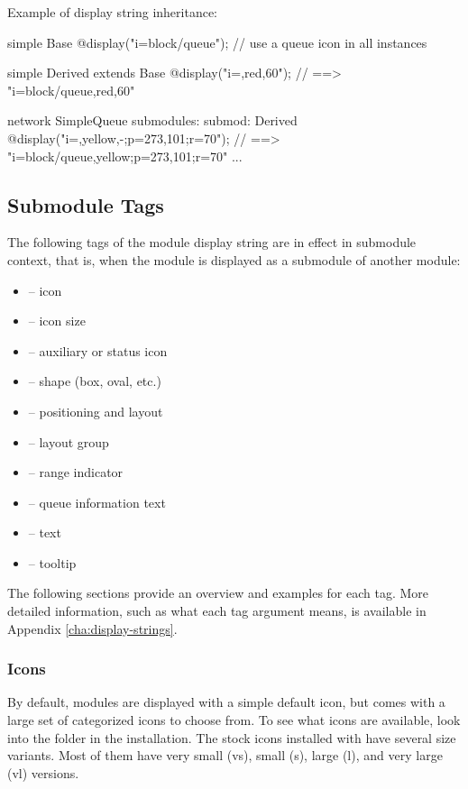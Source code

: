 Example of display string inheritance:

\begin{ned}
simple Base {
    @display("i=block/queue"); // use a queue icon in all instances
}

simple Derived extends Base {
    @display("i=,red,60");  // ==> "i=block/queue,red,60"
}

network SimpleQueue {
    submodules:
        submod: Derived {
            @display("i=,yellow,-;p=273,101;r=70");
                     // ==> "i=block/queue,yellow;p=273,101;r=70"
        }
        ...
}
\end{ned}


\subsection{Submodule Tags}
\label{sec:graphics:submodule-displaystring-tags}

The following tags of the module display string are in effect in submodule
context, that is, when the module is displayed as a submodule of another
module:

\begin{itemize}
  \item {} -- icon
  \item {} -- icon size
  \item {} -- auxiliary or status icon
  \item {} -- shape (box, oval, etc.)
  \item {} -- positioning and layout
  \item {} -- layout group
  \item {} -- range indicator
  \item {} -- queue information text
  \item {} -- text
  \item {} -- tooltip
\end{itemize}

The following sections provide an overview and examples for each tag. More
detailed information, such as what each tag argument means, is available in
Appendix \ref{cha:display-strings}.

\subsubsection{Icons}
\label{sec:graphics:submodule-icons}

By default, modules are displayed with a simple default icon, but {\opp} comes
with a large set of categorized icons to choose from. To see what icons are
available, look into the  folder in the {\opp} installation. The
stock icons installed with {\opp} have several size variants. Most of them have
very small (vs), small (s), large (l), and very large (vl) versions.

